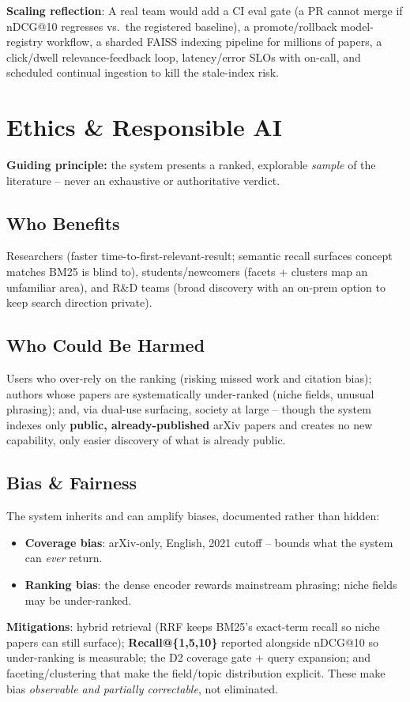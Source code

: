 \documentclass[12pt,a4paper]{article}
\begin{document}
\textbf{Scaling reflection}: A real team would add a CI eval gate (a PR cannot merge if nDCG@10 regresses vs.\ the registered baseline), a promote/rollback model-registry workflow, a sharded FAISS indexing pipeline for millions of papers, a click/dwell relevance-feedback loop, latency/error SLOs with on-call, and scheduled continual ingestion to kill the stale-index risk.

\section{Ethics \& Responsible AI}

\textbf{Guiding principle:} the system presents a ranked, explorable \emph{sample} of the literature -- never an exhaustive or authoritative verdict.

\subsection{Who Benefits}
Researchers (faster time-to-first-relevant-result; semantic recall surfaces concept matches BM25 is blind to), students/newcomers (facets + clusters map an unfamiliar area), and R\&D teams (broad discovery with an on-prem option to keep search direction private).

\subsection{Who Could Be Harmed}
Users who over-rely on the ranking (risking missed work and citation bias); authors whose papers are systematically under-ranked (niche fields, unusual phrasing); and, via dual-use surfacing, society at large -- though the system indexes only \textbf{public, already-published} arXiv papers and creates no new capability, only easier discovery of what is already public.

\subsection{Bias \& Fairness}
The system inherits and can amplify biases, documented rather than hidden:
\begin{itemize}\setlength\itemsep{0.15em}
  \item \textbf{Coverage bias}: arXiv-only, English, 2021 cutoff -- bounds what the system can \emph{ever} return.
  \item \textbf{Ranking bias}: the dense encoder rewards mainstream phrasing; niche fields may be under-ranked.
\end{itemize}
\textbf{Mitigations}: hybrid retrieval (RRF keeps BM25's exact-term recall so niche papers can still surface); \textbf{Recall@\{1,5,10\}} reported alongside nDCG@10 so under-ranking is measurable; the D2 coverage gate + query expansion; and faceting/clustering that make the field/topic distribution explicit. These make bias \emph{observable and partially correctable}, not eliminated.
\end{document}
